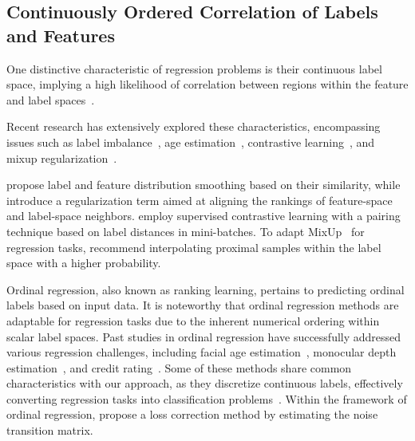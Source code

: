\documentclass{article}
\theoremstyle{plain}
\theoremstyle{definition}
\theoremstyle{remark}
\begin{document}

\subsection{Continuously Ordered Correlation of Labels and Features}\label{subsec:continuity_related_works}
One distinctive characteristic of regression problems is their continuous label space, implying a high likelihood of correlation between regions within the feature and label spaces~\citep{yang21ldsfds, gong22rank, zha22supcr}.

Recent research has extensively explored these characteristics, encompassing issues such as label imbalance~\citep{yang21ldsfds, gong22rank}, age estimation~\citep{li19bridge}, contrastive learning~\citep{zha22supcr}, and mixup regularization~\citep{yao22cmixup}. 

\citet{yang21ldsfds} propose label and feature distribution smoothing based on their similarity, while \citet{gong22rank} introduce a regularization term aimed at aligning the rankings of feature-space and label-space neighbors. 
\citet{zha22supcr} employ supervised contrastive learning with a pairing technique based on label distances in mini-batches. 
To adapt MixUp~\citep{zhang18mixup} for regression tasks, \citet{yao22cmixup} recommend interpolating proximal samples within the label space with a higher probability.

Ordinal regression, also known as ranking learning, pertains to predicting ordinal labels based on input data. 
It is noteworthy that ordinal regression methods are adaptable for regression tasks due to the inherent numerical ordering within scalar label spaces. 
Past studies in ordinal regression have successfully addressed various regression challenges, including facial age estimation~\citep{niu16afad, shin2022moving}, monocular depth estimation~\citep{fu2018deep}, and credit rating~\citep{hirk2019multivariate}. 
Some of these methods share common characteristics with our approach, as they discretize continuous labels, effectively converting regression tasks into classification problems~\citep{niu16afad, fu2018deep, shah2022label}. 
Within the framework of ordinal regression, \citet{garg2020robust} propose a loss correction method by estimating the noise transition matrix.
\end{document}
